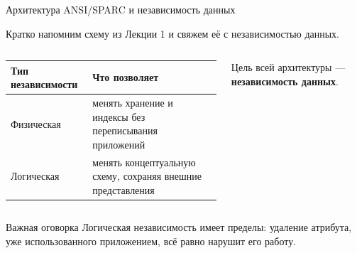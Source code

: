 \documentclass[aspectratio=169]{beamer}
\begin{document}
\begin{frame}{Архитектура ANSI/SPARC и независимость данных}

\footnotesize
Кратко напомним схему из Лекции 1 и свяжем её
с независимостью данных.

\begin{columns}[T]

\centering
{}

\scriptsize
\begin{tabular}{p{}|p{}}
\toprule
Тип независимости & Что позволяет\\
\midrule
Физическая & менять хранение и индексы без переписывания приложений\\
Логическая & менять концептуальную схему, сохраняя внешние представления\\
\bottomrule
\end{tabular}

\vspace{0.3cm}
Цель всей архитектуры — \textbf{независимость данных}.

\end{columns}

\vspace{0.25cm}
\begin{alertblock}{Важная оговорка}
Логическая независимость имеет пределы: удаление
атрибута, уже использованного приложением, всё равно
нарушит его работу.
\end{alertblock}

\end{frame}


\end{document}
